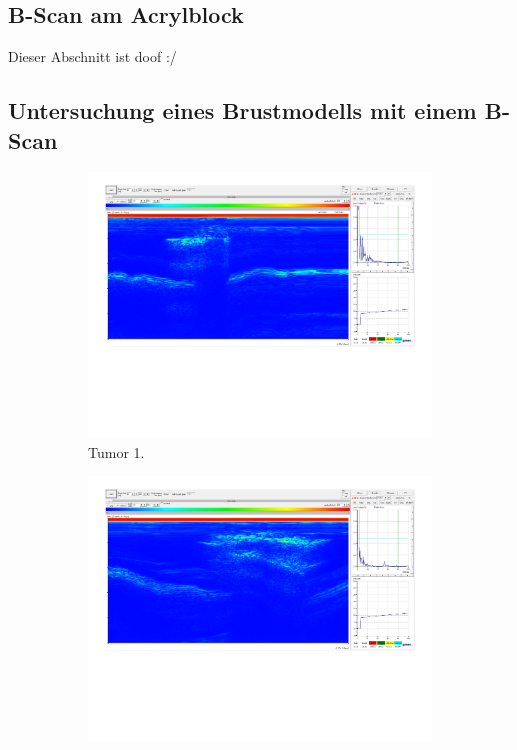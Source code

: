 \subsection{B-Scan am Acrylblock}

Dieser Abschnitt ist doof :/
   
\subsection{Untersuchung eines Brustmodells mit einem B-Scan}%
\label{sec:ausw_brust}
\begin{figure}%
    \begin{subfigure}{0.48\textwidth}%
        \centering%
        \includegraphics[width=\textwidth]{Messdaten/Tumor 1D.pdf}%
        \caption{Tumor 1.}%
        \label{fig:tumor_1}%
    \end{subfigure}%
    \begin{subfigure}{0.48\textwidth}%
        \centering%
        \includegraphics[width=\textwidth]{Messdaten/Tumor 2B.pdf}%

\end{subfigure}
\end{figure}

